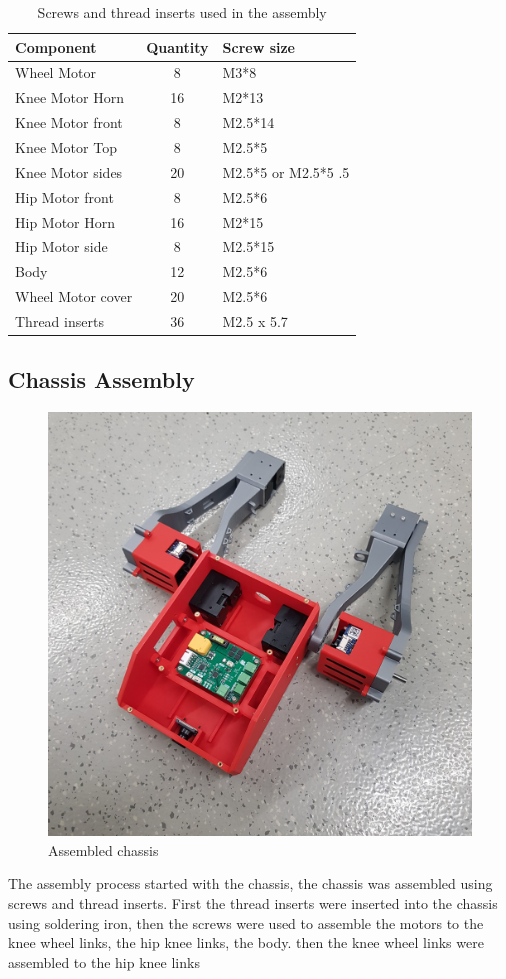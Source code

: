 \begin{table}[h!]
	\centering
	\caption{Screws and thread inserts used in the assembly}
	\label{tab:screws}
	\begin{tabular}{lcl}
		\toprule
		Component & Quantity & Screw size \\
		\midrule
		Wheel Motor & 8 & M3*8 \\
		Knee Motor Horn & 16 & M2*13 \\
		Knee Motor front & 8 & M2.5*14 \\
		Knee Motor Top & 8 & M2.5*5 \\
		Knee Motor sides & 20 & M2.5*5 or M2.5*5 .5 \\
		Hip Motor front & 8 & M2.5*6 \\
		Hip Motor Horn & 16 & M2*15 \\
		Hip Motor side & 8 & M2.5*15 \\
		Body & 12 & M2.5*6 \\
		Wheel Motor cover & 20 & M2.5*6 \\
		Thread inserts & 36 & M2.5 x 5.7 \\
		\bottomrule
	\end{tabular}
\end{table}


\subsection{Chassis Assembly}
\begin{figure}[h]
	\centering
	\includegraphics[width=0.5\linewidth]{chassis_assembled}
	\caption{Assembled chassis}
	\label{fig:chassisassembled}
\end{figure}
The assembly process started with the chassis, the chassis was assembled using screws and thread inserts.
First the thread inserts were inserted into the chassis using soldering iron, then the screws were used to assemble the motors to the knee wheel links, the hip knee links, the body.
then the knee wheel links were assembled to the hip knee links

